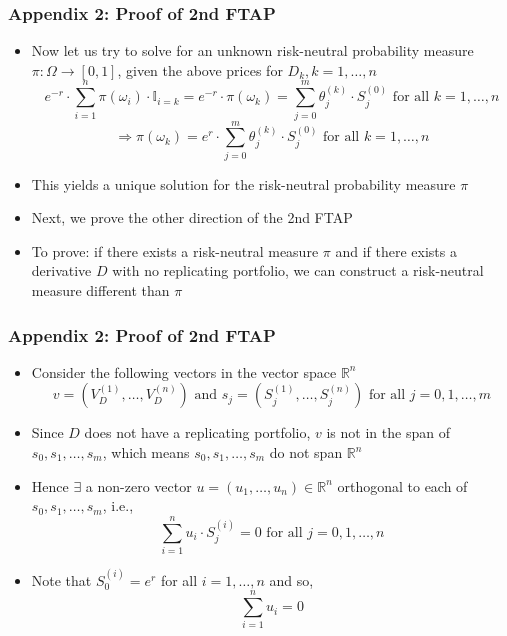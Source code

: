 \documentclass{beamer}
\begin{document}
\begin{frame}
\frametitle{Appendix 2: Proof of 2nd FTAP}
\begin{itemize}
\item Now let us try to solve for an unknown risk-neutral probability measure $\pi : \Omega \rightarrow [0, 1]$, given the above prices for $D_k, k = 1, \ldots, n$
$$e^{-r} \cdot \sum_{i=1}^n \pi(\omega_i) \cdot \mathbb{I}_{i=k} = e^{-r} \cdot \pi(\omega_k) = \sum_{j=0}^m \theta_j^{(k)} \cdot S_j^{(0)} \mbox{ for all } k = 1, \ldots, n$$
$$\Rightarrow \pi(\omega_k) = e^r \cdot \sum_{j=0}^m \theta_j^{(k)} \cdot S_j^{(0)} \mbox{ for all } k = 1, \ldots, n$$
\item This yields a unique solution for the risk-neutral probability measure $\pi$
\item Next, we prove the other direction of the 2nd FTAP
\item  To prove: if there exists a risk-neutral measure $\pi$ and if there exists a derivative $D$ 
with no replicating portfolio, we can construct a risk-neutral measure different than $\pi$
\end{itemize}
\end{frame}

\begin{frame}
\frametitle{Appendix 2: Proof of 2nd FTAP}
\begin{itemize}
\item Consider the following vectors in the vector space $\mathbb{R}^n$
$$v = (V_D^{(1)}, \ldots, V_D^{(n)}) \mbox{ and } s_j = (S_j^{(1)}, \ldots, S_j^{(n)}) \mbox{ for all } j = 0, 1, \ldots, m$$
\item Since $D$ does not have a replicating portfolio, $v$ is not in the span of $s_0, s_1, \ldots, s_m$, which 
means $s_0, s_1, \ldots, s_m$ do not span $\mathbb{R}^n$
\item Hence $\exists$ a non-zero vector $u = (u_1, \ldots, u_n) \in \mathbb{R}^n$ orthogonal to each of $s_0, s_1, \ldots, s_m$, i.e.,
\begin{equation}
\sum_{i=1}^n u_i \cdot S_j^{(i)} = 0 \mbox{ for all } j = 0,1, \ldots, n \label{eq:orthogonal}
\end{equation}
\item Note that $S_0^{(i)} = e^r$ for all $i = 1, \ldots, n$ and so,
\begin{equation}
\sum_{i=1}^n u_i = 0 \label{eq:partitionunity}
\end{equation}
\end{itemize}
\end{frame}
\end{document}
